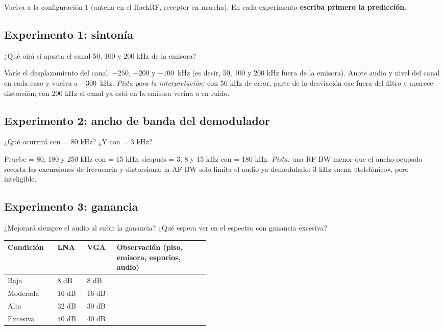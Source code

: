 Vuelva a la configuración 1 (antena en el HackRF, receptor en marcha). En cada experimento \textbf{escriba primero la predicción}.

\subsection{Experimento 1: sintonía}

\begin{prediccion}
¿Qué oirá si aparta el canal 50, 100 y 200 kHz de la emisora?
\end{prediccion}
Varíe el desplazamiento del canal: $-250$, $-200$ y $-100$~kHz (es decir, 50, 100 y 200 kHz fuera de la emisora). Anote audio y nivel del canal en cada caso y vuelva a $-300$~kHz. \emph{Pista para la interpretación:} con 50 kHz de error, parte de la desviación cae fuera del filtro y aparece distorsión; con 200 kHz el canal ya está en la emisora vecina o en ruido.

\subsection{Experimento 2: ancho de banda del demodulador}

\begin{prediccion}
¿Qué ocurrirá con  = 80 kHz? ¿Y con  = 3 kHz?
\end{prediccion}
Pruebe  = 80, 180 y 250 kHz con  = 15 kHz; después  = 3, 8 y 15 kHz con  = 180 kHz. \emph{Pista:} una RF BW menor que el ancho ocupado recorta las excursiones de frecuencia y distorsiona; la AF BW solo limita el audio ya demodulado: 3 kHz suena «telefónico», pero inteligible.

\subsection{Experimento 3: ganancia}

\begin{prediccion}
¿Mejorará siempre el audio al subir la ganancia? ¿Qué espera ver en el espectro con ganancia excesiva?
\end{prediccion}

\begin{longtable}{@{}lllp{0.46\linewidth}@{}}
\toprule
\textbf{Condición} & \textbf{LNA} & \textbf{VGA} & \textbf{Observación (piso, emisora, espurios, audio)} \\
\midrule
\endhead
Baja & 8 dB & 8 dB & \\[1.5ex]
Moderada & 16 dB & 16 dB & \\[1.5ex]
Alta & 32 dB & 30 dB & \\[1.5ex]
Excesiva & 40 dB & 40 dB & \\[1.5ex]
\bottomrule
\end{longtable}

